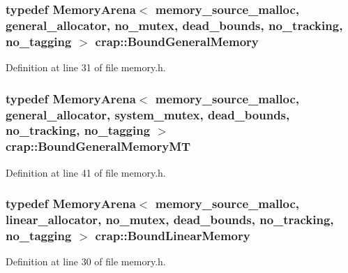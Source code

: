 \hypertarget{namespacecrap_aaff1250c80e3631796871d2e94b4d187}{}
\subsubsection[{Bound\+General\+Memory}]{\setlength{\rightskip}{0pt plus 5cm}typedef {\bf Memory\+Arena}$<$ {\bf memory\+\_\+source\+\_\+malloc}, {\bf general\+\_\+allocator}, {\bf no\+\_\+mutex}, {\bf dead\+\_\+bounds}, {\bf no\+\_\+tracking}, {\bf no\+\_\+tagging} $>$ {\bf crap\+::\+Bound\+General\+Memory}}\label{namespacecrap_aaff1250c80e3631796871d2e94b4d187}


Definition at line 31 of file memory.\+h.

\hypertarget{namespacecrap_a319a79ca62a9c225a5e10d662c366828}{}
\subsubsection[{Bound\+General\+Memory\+M\+T}]{\setlength{\rightskip}{0pt plus 5cm}typedef {\bf Memory\+Arena}$<$ {\bf memory\+\_\+source\+\_\+malloc}, {\bf general\+\_\+allocator}, {\bf system\+\_\+mutex}, {\bf dead\+\_\+bounds}, {\bf no\+\_\+tracking}, {\bf no\+\_\+tagging} $>$ {\bf crap\+::\+Bound\+General\+Memory\+M\+T}}\label{namespacecrap_a319a79ca62a9c225a5e10d662c366828}


Definition at line 41 of file memory.\+h.

\hypertarget{namespacecrap_aa20da4e8cbab540052136fe0dc25815c}{}
\subsubsection[{Bound\+Linear\+Memory}]{\setlength{\rightskip}{0pt plus 5cm}typedef {\bf Memory\+Arena}$<$ {\bf memory\+\_\+source\+\_\+malloc}, {\bf linear\+\_\+allocator}, {\bf no\+\_\+mutex}, {\bf dead\+\_\+bounds}, {\bf no\+\_\+tracking}, {\bf no\+\_\+tagging} $>$ {\bf crap\+::\+Bound\+Linear\+Memory}}\label{namespacecrap_aa20da4e8cbab540052136fe0dc25815c}


Definition at line 30 of file memory.\+h.

\hypertarget{namespacecrap_a55259fc8a1932b947a5b796be2f346dc}{}
